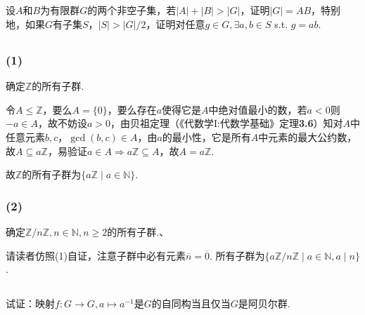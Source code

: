 \subsection{}
设$A$和$B$为有限群$G$的两个非空子集，若$|A|+|B|>|G|$，证明$|G|=AB$，特别地，如果$G$有子集$S$，$|S|>|G|/2$，证明对任意$g\in G, \exists a,b\in S$ s.t. $g=ab$.


\subsection{}
\subsubsection{(1)}
确定$\mathbb{Z}$的所有子群.

\jie 令$A\leq \mathbb{Z}$，要么$A=\{0\}$，要么存在$a$使得它是$A$中绝对值最小的数，若$a<0$则$-a\in A$，故不妨设$a>0$，由贝祖定理（{\heiti 《代数学I:代数学基础》定理}\textbf{3.6}）知对$A$中任意元素$b,c$，$\gcd(b,c)\in A$，由$a$的最小性，它是所有$A$中元素的最大公约数，故$A\subseteq a\mathbb{Z}$，易验证$a\in A\Rightarrow a\mathbb{Z}\subseteq A$，故$A=a\mathbb{Z}$.

故$\mathbb{Z}$的所有子群为$\{a\mathbb{Z}\mid a\in\mathbb{N}\}$.

\subsubsection{(2)}
确定$\mathbb{Z}/n\mathbb{Z}, n\in\mathbb{N}, n\geq 2$的所有子群.、

\jie 请读者仿照(1)自证，注意子群中必有元素$\overline{n}=\overline{0}$. 所有子群为$\{a\mathbb{Z}/n\mathbb{Z}\mid a\in\mathbb{N}, a\mid n\}$.

\subsection{}
试证：映射$f: G\rightarrow G, a\mapsto a^{-1}$是$G$的自同构当且仅当$G$是阿贝尔群.


